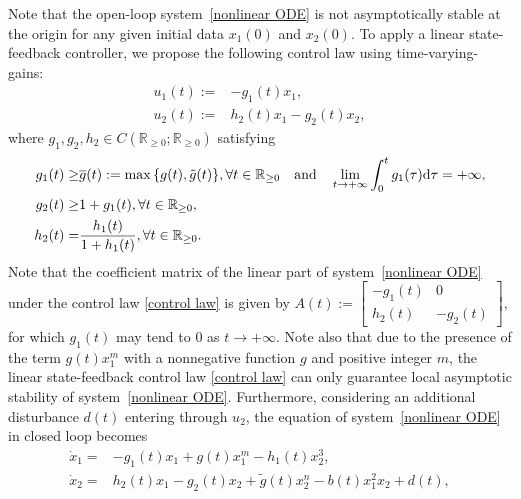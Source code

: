 \documentclass[onecolumn]{autart}
\newenvironment{proof of Prop.ODE}{{\it Proof of Proposition~\ref{Prop.ODE}:\enspace}}{\hfill $\blacksquare$\par}
\newenvironment{proof of PDE}{{\it Proof of Proposition \ref{Prop.8}:\enspace}}{\hfill $\blacksquare$\par}
\begin{document}
{Note that the open-loop system~\eqref{nonlinear ODE} is not asymptotically stable at the origin for any given   initial data $x_1(0)$ and $x_2(0) $.
%
%
To apply a linear state-feedback controller,  we propose the following  control law using time-varying-gains:
\begin{subequations}\label{control law}
\begin{align}
	u_1(t):=&-g_1(t)x_1, \\
	u_2(t):=&h_2(t)x_1-g_2(t)x_2,
\end{align}
\end{subequations}
where $g_1,g_2,h_2\in C(\mathbb{R}_{\geq 0};\mathbb{R}_{\geq 0})$ satisfying
\begin{align}
g_1(t)\geq& {\overline{g}(t):=\max\left\{g(t),\tilde{g}(t)\right\}}, \forall t\in\mathbb{R}_{\geq0} \quad\text{and}\quad
\lim\limits_{t\rightarrow +\infty}\int_0^tg_1(\tau){\rm{d}}\tau=+\infty,\label{con-1}\\
g_2(t)\geq& 1+g_1(t),\forall t\in\mathbb{R}_{\geq0},\label{con-2}\\
h_2(t)=&\frac{h_1(t)}{1+h_1(t)},\forall t\in\mathbb{R}_{\geq0}\label{con-3}.
\end{align}
{Note that the coefficient matrix  of the linear part of system~\eqref{nonlinear ODE} under the control law \eqref{control law} is given by $A(t):=\begin{bmatrix}
-g_1(t) & 0\\
h_2(t) & -g_2(t)
\end{bmatrix}$, for which $g_1(t)$ may tend to $0$ as $t\to +\infty$.}
Note also that due to the presence of the term $g(t)x^m_1$ with a nonnegative function $g$ and positive integer $m$, the linear state-feedback control law \eqref{control law} can only
guarantee local asymptotic stability of system~\eqref{nonlinear ODE}. Furthermore, considering an additional disturbance $d(t)$ entering through $u_2$, the equation of   system~\eqref{nonlinear ODE} in closed loop becomes
\begin{subequations}\label{nonlinear ODE-closed loop}
\begin{align}
	\dot{x}_1 =&-g_1(t)x_1+g(t)x^m_1-h_1(t)x_2^3   , \\
	\dot{x}_2 =&h_2(t)x_1-g_2(t)x_2+{\tilde{g}(t)x^n_2}-b(t)x_1^2x_2+d(t) ,
\end{align}
\end{subequations}


}
\end{document}
